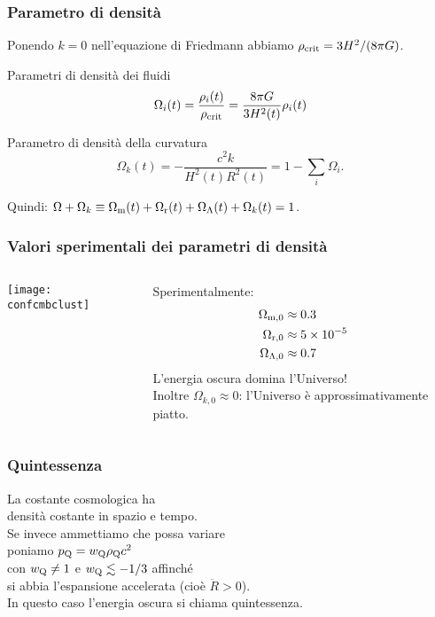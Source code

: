 \begin{frame}
  \frametitle{Parametro di densità}
  Ponendo $k=0$ nell'equazione di Friedmann abbiamo $\rho_{\textup{crit}} =
  3H^2/(8\pi G)$.
  \begin{block}{Parametri di densità dei fluidi}
    \begin{equation*}
      \Omega_i(t) = \frac{\rho_i(t)}{\rho_{\textup{crit}}} = \frac{8\pi
        G}{3H^2(t)}\rho_i(t)
    \end{equation*}
  \end{block}
  \begin{block}{Parametro di densità della curvatura}
    \begin{equation*}
      \Omega_k(t) = -\frac{c^2k}{H^2(t)R^2(t)} = 1 - \sum_i \Omega_i.
    \end{equation*}
  \end{block}
  Quindi: $\Omega + \Omega_k \equiv \Omega_{\textup{m}}(t) +
  \Omega_{\textup{r}}(t) + \Omega_\Lambda(t) + \Omega_k(t) = 1$.
\end{frame}

\begin{frame}
  \frametitle{Valori sperimentali dei parametri di densità}
  \begin{columns}
    \begin{column}{0.5\columnwidth}
      \texttt{[image: confcmbclust]}
    \end{column}
    \begin{column}{0.4\columnwidth}
      Sperimentalmente:
      \begin{align*}
        \Omega_{\textup{m},0} &\approx \num{0.3} \\
        \Omega_{\textup{r},0} &\approx \num{5e-5} \\
        \Omega_{\Lambda,0} &\approx \num{0.7}
      \end{align*}
      L'energia oscura domina l'Universo! \\
      Inoltre $\Omega_{k,0} \approx 0$: l'Universo è approssimativamente piatto.
    \end{column}
  \end{columns}
\end{frame}

\begin{frame}
  \frametitle{Quintessenza}
  La costante cosmologica ha \\
  densità costante in spazio e tempo. \\
  Se invece ammettiamo che possa variare \\
  poniamo $p_{\textup{Q}} = w_{\textup{Q}}\rho_{\textup{Q}}c^2$ \\
  con $w_{\textup{Q}} \neq 1$ e $w_{\textup{Q}} \lesssim -1/3$ affinché \\
  si abbia l'espansione accelerata (cioè $\ddot{R}>0$). \\
  In questo caso l'energia oscura si chiama \alert{quintessenza}.
\end{frame}

